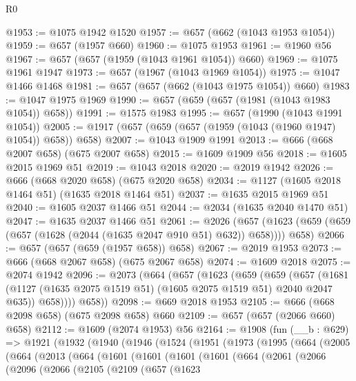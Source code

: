 \begin{lexlean}{R0}
\begin{coremodule}
@1953 := @1075 @1942 @1520
@1957 := @657 (@662 (@1043 @1953 @1054))
@1959 := @657 (@1957 @660)
@1960 := @1075 @1953
@1961 := @1960 @56
@1967 := @657 (@657 (@1959 (@1043 @1961 @1054)) @660)
@1969 := @1075 @1961 @1947
@1973 := @657 (@1967 (@1043 @1969 @1054))
@1975 := @1047 @1466 @1468
@1981 := @657 (@657 (@662 (@1043 @1975 @1054)) @660)
@1983 := @1047 @1975 @1969
@1990 := @657 (@659 (@657 (@1981 (@1043 @1983 @1054)) @658))
@1991 := @1575 @1983
@1995 := @657 (@1990 (@1043 @1991 @1054))
@2005 := @1917 (@657 (@659 (@657 (@1959 (@1043 (@1960 @1947) @1054)) @658)) @658)
@2007 := @1043 @1909 @1991
@2013 := @666 (@668 @2007 @658) (@675 @2007 @658)
@2015 := @1609 @1909 @56
@2018 := @1605 @2015 @1969 @51
@2019 := @1043 @2018
@2020 := @2019 @1942
@2026 := @666 (@668 @2020 @658) (@675 @2020 @658)
@2034 := @1127 (@1605 @2018 @1464 @51) (@1635 @2018 @1464 @51)
@2037 := @1635 @2015 @1969 @51
@2040 := @1605 @2037 @1466 @51
@2044 := @2034 (@1635 @2040 @1470 @51)
@2047 := @1635 @2037 @1466 @51
@2061 := @2026
    (@657 (@1623 (@659 (@659 (@657 (@1628 (@2044 (@1635 @2047 @910 @51) @632)) @658)))) @658)
@2066 := @657 (@657 (@659 (@1957 @658)) @658)
@2067 := @2019 @1953
@2073 := @666 (@668 @2067 @658) (@675 @2067 @658)
@2074 := @1609 @2018
@2075 := @2074 @1942
@2096 := @2073
    (@664
      (@657
        (@1623
          (@659
            (@659
              (@657
                (@1681 (@1127 (@1635 @2075 @1519 @51) (@1605 @2075 @1519 @51) @2040 @2047 @635))
                @658))))
        @658))
@2098 := @669 @2018 @1953
@2105 := @666 (@668 @2098 @658) (@675 @2098 @658) @660
@2109 := @657 (@657 (@2066 @660) @658)
@2112 := @1609 (@2074 @1953) @56
@2164 := @1908
    (fun (__b : @629) =>
    @1921
      (@1932
        (@1940
          (@1946
            (@1524
              (@1951
                (@1973
                  (@1995
                    (@664
                      (@2005
                        (@664
                          (@2013
                            (@664
                              (@1601
                                (@1601
                                  (@1601
                                    (@1601
                                      (@664
                                        (@2061
                                          (@2066
                                            (@2096
                                              (@2066
                                                (@2105
                                                  (@2109
                                                    (@657
                                                      (@1623

\end{coremodule}
\end{lexlean}
